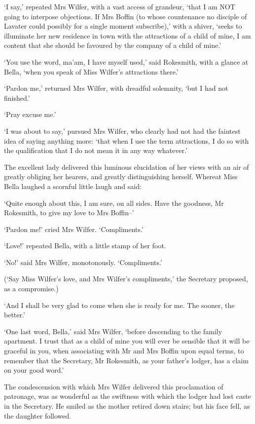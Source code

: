 ‘I say,’ repeated Mrs Wilfer, with a vast access of grandeur, ‘that I am
NOT going to interpose objections. If Mrs Boffin (to whose countenance
no disciple of Lavater could possibly for a single moment subscribe),’
with a shiver, ‘seeks to illuminate her new residence in town with the
attractions of a child of mine, I am content that she should be favoured
by the company of a child of mine.’

‘You use the word, ma’am, I have myself used,’ said Rokesmith, with a
glance at Bella, ‘when you speak of Miss Wilfer’s attractions there.’

‘Pardon me,’ returned Mrs Wilfer, with dreadful solemnity, ‘but I had
not finished.’

‘Pray excuse me.’

‘I was about to say,’ pursued Mrs Wilfer, who clearly had not had
the faintest idea of saying anything more: ‘that when I use the term
attractions, I do so with the qualification that I do not mean it in any
way whatever.’

The excellent lady delivered this luminous elucidation of her views
with an air of greatly obliging her hearers, and greatly distinguishing
herself. Whereat Miss Bella laughed a scornful little laugh and said:

‘Quite enough about this, I am sure, on all sides. Have the goodness, Mr
Rokesmith, to give my love to Mrs Boffin--’

‘Pardon me!’ cried Mrs Wilfer. ‘Compliments.’

‘Love!’ repeated Bella, with a little stamp of her foot.

‘No!’ said Mrs Wilfer, monotonously. ‘Compliments.’

(‘Say Miss Wilfer’s love, and Mrs Wilfer’s compliments,’ the Secretary
proposed, as a compromise.)

‘And I shall be very glad to come when she is ready for me. The sooner,
the better.’

‘One last word, Bella,’ said Mrs Wilfer, ‘before descending to the
family apartment. I trust that as a child of mine you will ever be
sensible that it will be graceful in you, when associating with Mr
and Mrs Boffin upon equal terms, to remember that the Secretary, Mr
Rokesmith, as your father’s lodger, has a claim on your good word.’

The condescension with which Mrs Wilfer delivered this proclamation of
patronage, was as wonderful as the swiftness with which the lodger
had lost caste in the Secretary. He smiled as the mother retired down
stairs; but his face fell, as the daughter followed.

